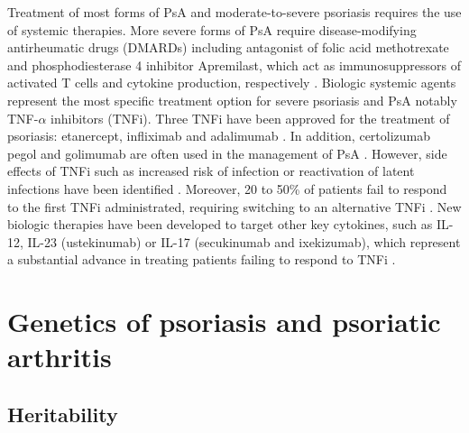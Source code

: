 Treatment of most forms of PsA and moderate-to-severe psoriasis requires the use of systemic therapies. More severe forms of PsA require disease-modifying antirheumatic drugs (DMARDs) including antagonist of folic acid methotrexate and phosphodiesterase 4 inhibitor Apremilast, which act as immunosuppressors of activated T cells and cytokine production, respectively \parencite{Schmitt2014, Gossec2016, Keating2017,Polachek2017}. Biologic systemic agents represent the most specific treatment option for severe psoriasis and PsA notably TNF-$\alpha$ inhibitors (TNFi). Three TNFi have been approved for the treatment of psoriasis: etanercept, infliximab and adalimumab \parencite{Mahil2016}. In addition, certolizumab pegol and golimumab are often used in the management of PsA \parencite{Coates2016a}. However, side effects of TNFi such as increased risk of infection or reactivation of latent infections have been identified \parencite{Gottlieb2003}. Moreover, 20 to 50\% of patients fail to respond to the first TNFi administrated, requiring switching to an alternative TNFi \parencite{Abramson2016}. New biologic therapies have been developed to target other key cytokines, such as IL-12, IL-23 (ustekinumab) or IL-17 (secukinumab and ixekizumab), which represent a substantial advance in treating patients failing to respond to TNFi \parencite{Mahil2016, Coates2016a}.


 

\section{Genetics of psoriasis and psoriatic arthritis}

\subsection{Heritability}


